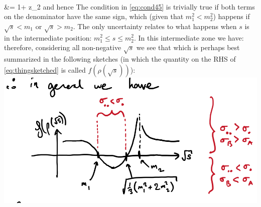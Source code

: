 \begin{allparts}
{\\
&=
1+ {z_2}\label{eq:thingsketched}
}and hence
The condition in \eqref{eq:cond45} is trivially true if both terms on the denominator have the same sign, which (given that $m_1^2<m_2^2$) happens if $\sqrt s<m_1$ or $\sqrt s>m_2$.  The only uncertainty relates to what happens when $s$ is in the intermediate position: $m_1^2 \le s \le m_2^2$. In this intermediate zone we have:
therefore, considering all non-negative $\sqrt s$ we see that
which is perhaps best summarized in the following sketches (in which the quantity on the RHS of  \eqref{eq:thingsketched} is called $f(\rho(\sqrt s))$):
\includegraphics[width=\textwidth]{cropped_working_diag}




\end{allparts}

